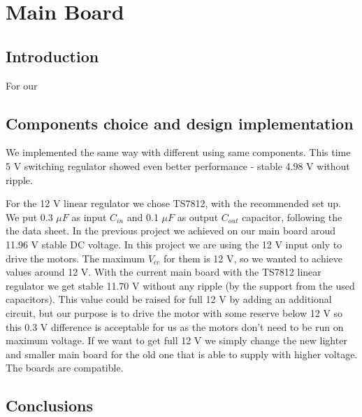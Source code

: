 \chapter{Main Board}
\section{Introduction}
For our 

\section{Components choice and design implementation}
We implemented the same way with different using same components. This time 5 V switching regulator showed even better performance - stable 4.98 V without ripple.

 For the 12 V linear regulator we chose TS7812, with the recommended set up. We put 0.3 $\mu F$ as input $C_{in}$ and 0.1  $\mu F$ as output $C_{out}$ capacitor, following the the data sheet. In the previous project we achieved on our main board aroud 11.96 V stable DC voltage. In this project we are using the 12 V input only to drive the motors. The maximum $V_{cc}$ for them is 12 V, so we wanted to achieve values around 12 V. With the current main board with the TS7812 linear regulator we get stable 11.70 V without any ripple (by the support from the used capacitors). This value could be raised for full 12 V by adding an additional circuit, but our purpose is to drive the motor with some reserve below 12 V so this 0.3 V difference is acceptable for us as the motors don't need to be run on maximum voltage. If we want to get full 12 V we simply change the new lighter and smaller main board for the old one that is able to supply with higher voltage. The boards are compatible. 
 
\section{Conclusions}
